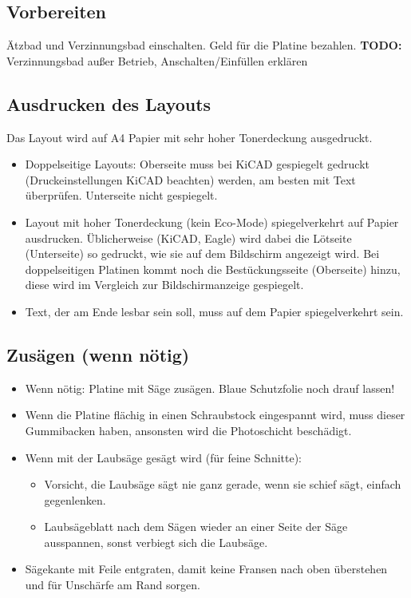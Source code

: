 \documentclass{\basedir/fablab-document}
\begin{document}
\subsection{Vorbereiten}
\label{sec:vorbereiten}
Ätzbad und Verzinnungsbad einschalten. Geld für die Platine bezahlen. \textbf{TODO: } Verzinnungsbad außer Betrieb, Anschalten/Einfüllen erklären

\subsection{Ausdrucken des Layouts}
\label{sec:ausdrucken}
Das Layout wird auf A4 Papier mit sehr hoher Tonerdeckung ausgedruckt.
\begin{itemize}
\item Doppelseitige Layouts: Oberseite muss bei KiCAD gespiegelt gedruckt (Druckeinstellungen KiCAD beachten) werden, am besten mit Text überprüfen. Unterseite nicht gespiegelt.
\item Layout mit hoher Tonerdeckung (kein Eco-Mode) spiegelverkehrt auf Papier ausdrucken. Üblicherweise (KiCAD, Eagle) wird dabei die Lötseite (Unterseite) so gedruckt, wie sie auf dem Bildschirm angezeigt wird. Bei doppelseitigen Platinen kommt noch die Bestückungsseite (Oberseite) hinzu, diese wird im Vergleich zur Bildschirmanzeige gespiegelt.
\item Text, der am Ende lesbar sein soll, muss auf dem Papier spiegelverkehrt sein.
\end{itemize}


\subsection{Zusägen (wenn nötig)}
\label{sec:zusaegen}
\begin{itemize}
\item Wenn nötig: Platine mit Säge zusägen. Blaue Schutzfolie noch drauf lassen!
\end{itemize}
\begin{itemize}
\item Wenn die Platine flächig in einen Schraubstock eingespannt wird, muss dieser Gummibacken haben, ansonsten wird die Photoschicht beschädigt.
\item Wenn mit der Laubsäge gesägt wird (für feine Schnitte):
	\begin{itemize}
	\item Vorsicht, die Laubsäge sägt nie ganz gerade, wenn sie schief sägt, einfach gegenlenken.
	\item Laubsägeblatt nach dem Sägen wieder an einer Seite der Säge ausspannen, sonst verbiegt sich die Laubsäge.
	\end{itemize}
\item Sägekante mit Feile entgraten, damit keine Fransen nach oben überstehen und für Unschärfe am Rand sorgen.
\end{itemize}
\end{document}
